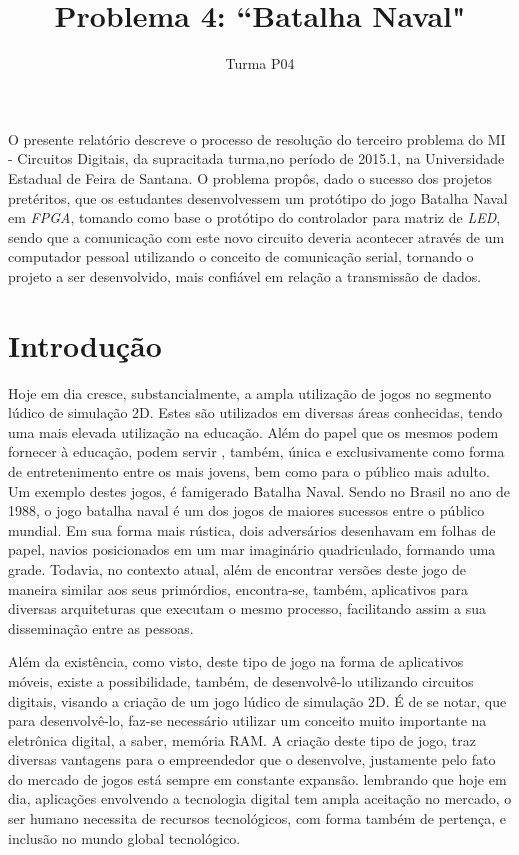 \documentclass[12pt]{article}
\title{Problema 4: ``Batalha Naval"}
\author{Turma P04}
\begin{document}
 

\maketitle

\begin{resumo} 
O presente relatório descreve o processo de resolução do terceiro problema do MI - Circuitos Digitais, da supracitada turma,no período de 2015.1, na Universidade Estadual de Feira de Santana. O problema propôs, dado o sucesso dos projetos pretéritos, que os estudantes desenvolvessem um protótipo do jogo Batalha Naval em \textit{FPGA}, tomando como base o  protótipo do controlador para matriz de \textit{LED}, sendo que a comunicação com este novo circuito deveria acontecer através de um computador pessoal utilizando o conceito de comunicação serial, tornando o projeto a ser desenvolvido, mais confiável em relação a transmissão de dados.
\end{resumo}

\section{Introdução}

Hoje em dia cresce, substancialmente, a ampla utilização de jogos no segmento lúdico de simulação 2D. Estes são utilizados em diversas áreas conhecidas, tendo uma mais elevada utilização na educação. Além do papel que os mesmos podem fornecer à educação, podem servir , também, única e exclusivamente como forma de entretenimento entre os mais jovens, bem como para o público mais adulto. Um exemplo destes jogos, é famigerado Batalha Naval. Sendo no Brasil no ano de 1988, o jogo batalha naval é um dos jogos de maiores sucessos entre o público mundial. Em sua forma mais rústica, dois adversários desenhavam em folhas de papel, navios posicionados em um mar imaginário quadriculado, formando uma grade. Todavia, no contexto atual, além de encontrar versões deste jogo de maneira similar aos seus primórdios, encontra-se, também, aplicativos para diversas arquiteturas que executam o mesmo processo, facilitando assim a sua disseminação entre as pessoas.

Além da existência, como visto, deste tipo de jogo na forma de aplicativos móveis, existe a possibilidade, também, de desenvolvê-lo utilizando circuitos digitais, visando a criação de um jogo lúdico de simulação 2D.  É de se notar, que para desenvolvê-lo, faz-se necessário utilizar um conceito muito importante na eletrônica digital, a saber, memória RAM. A criação deste tipo de jogo, traz diversas vantagens para o empreendedor que o desenvolve, justamente pelo fato do mercado de jogos está sempre em constante expansão. lembrando que hoje em dia, aplicações envolvendo a tecnologia digital tem ampla aceitação no mercado, o ser humano necessita de recursos tecnológicos, com forma também de pertença, e inclusão no mundo global tecnológico. 
\end{document}
